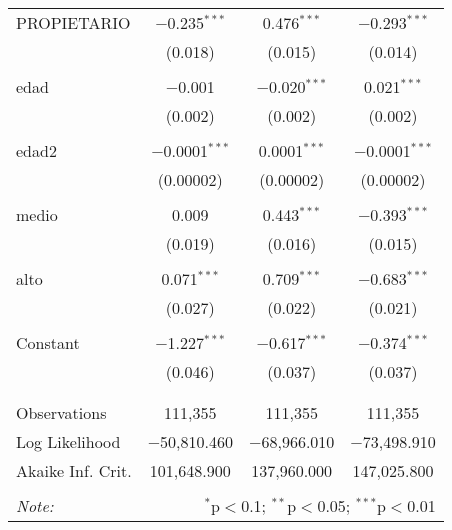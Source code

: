 \documentclass[10pt,a4paper]{book}
\begin{document}
\begin{table}[!htbp]
\begin{tabular}{@{\extracolsep{5pt}}lccc}
 PROPIETARIO & $-$0.235$^{***}$ & 0.476$^{***}$ & $-$0.293$^{***}$ \\ 
  & (0.018) & (0.015) & (0.014) \\ 
  & & & \\ 
 edad & $-$0.001 & $-$0.020$^{***}$ & 0.021$^{***}$ \\ 
  & (0.002) & (0.002) & (0.002) \\ 
  & & & \\ 
 edad2 & $-$0.0001$^{***}$ & 0.0001$^{***}$ & $-$0.0001$^{***}$ \\ 
  & (0.00002) & (0.00002) & (0.00002) \\ 
  & & & \\ 
 medio & 0.009 & 0.443$^{***}$ & $-$0.393$^{***}$ \\ 
  & (0.019) & (0.016) & (0.015) \\ 
  & & & \\ 
 alto & 0.071$^{***}$ & 0.709$^{***}$ & $-$0.683$^{***}$ \\ 
  & (0.027) & (0.022) & (0.021) \\ 
  & & & \\ 
 Constant & $-$1.227$^{***}$ & $-$0.617$^{***}$ & $-$0.374$^{***}$ \\ 
  & (0.046) & (0.037) & (0.037) \\ 
  & & & \\ 
\hline \\[-1.8ex] 
Observations & 111,355 & 111,355 & 111,355 \\ 
Log Likelihood & $-$50,810.460 & $-$68,966.010 & $-$73,498.910 \\ 
Akaike Inf. Crit. & 101,648.900 & 137,960.000 & 147,025.800 \\ 
\hline 
\hline \\[-1.8ex] 
\textit{Note:}  & \multicolumn{3}{r}{$^{*}$p$<$0.1; $^{**}$p$<$0.05; $^{***}$p$<$0.01} \\ 
\end{tabular} 
\end{table} 
\end{document}
